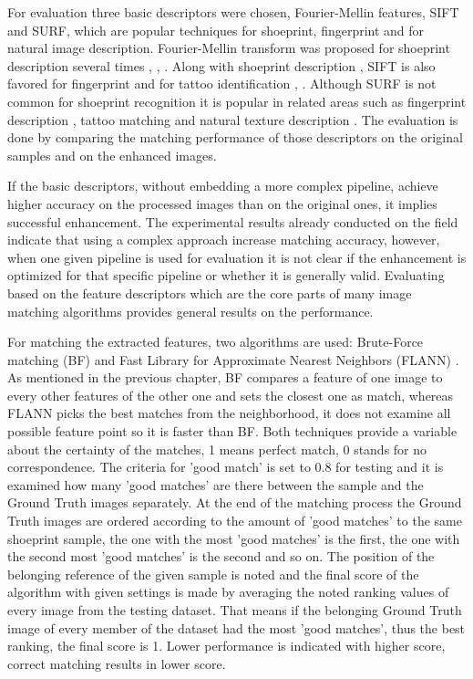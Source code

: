 \documentclass[draft,final]{vutinfth} %
\begin{document}
For evaluation three basic descriptors were chosen, Fourier-Mellin features, SIFT and SURF, which are popular techniques for shoeprint, fingerprint and for natural image description.
Fourier-Mellin transform was proposed for shoeprint description several times \cite{gueham2008automatic}, \cite{richetelli2017classification}, \cite{wu2019crime}.
Along with shoeprint description \cite{nibouche2009rotation}, \cite{richetelli2017classification} SIFT is also favored for fingerprint \cite{zhou2011adaptive} and for tattoo identification \cite{yi2015impact}, \cite{han2013tattoo}.
Although SURF is not common for shoeprint recognition it is popular in related areas such as fingerprint description \cite{jahan2017robust}, tattoo matching \cite{yi2015impact} and natural texture description \cite{prabhakar2012lbp}.
The evaluation is done by comparing the matching performance of those descriptors on the original samples and on the enhanced images.
\par
If the basic descriptors, without embedding  a more complex pipeline, achieve higher accuracy on the processed  images than on the original ones, it implies successful enhancement. 
The experimental results already conducted on the field indicate \cite{rida2019forensic} that using a complex approach increase matching accuracy, however, when one given pipeline is used for evaluation it is not clear if the enhancement is optimized for that specific pipeline or whether it is generally valid.
Evaluating based on the feature descriptors which are the core parts of many image matching algorithms provides general results on the performance.
\par
For matching the extracted features, two algorithms are used: Brute-Force matching (BF) \cite{schaeffer1993re} and Fast Library for Approximate Nearest Neighbors (FLANN) \cite{muja2009fast}.
As mentioned in the previous chapter, BF compares a feature of one image to every other features of the other one and sets the closest one as match, whereas FLANN picks the best matches from the neighborhood, it does not examine all possible feature point so it is faster than BF.
Both techniques provide a variable about the certainty of the matches, 1 means perfect match, 0 stands for no correspondence.
The criteria for 'good match' is set to 0.8 for testing and it is examined how many 'good matches' are there between the sample and the Ground Truth images separately.
At the end of the matching process the Ground Truth images are ordered according to the amount of 'good matches' to the same shoeprint sample, the one with the most 'good matches' is the first, the one with the second most 'good matches' is the second and so on.
The position of the belonging reference of the given sample is noted and the final score of the algorithm with given settings is made by averaging the noted ranking values  of every image from the testing dataset.
That means if the belonging Ground Truth image of every member of the dataset had the most 'good matches', thus the best ranking, the final score is 1.
Lower performance is indicated with higher score, correct matching results in lower score.
\end{document}

